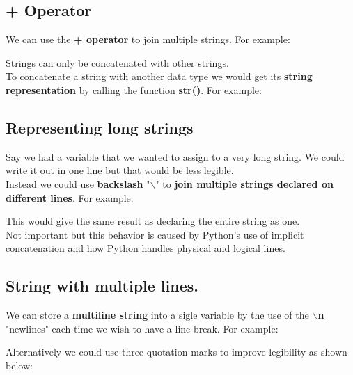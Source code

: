 \documentclass[13pt,a4paper,oneside]{book}
\begin{document}
\subsection{+ Operator}%
\label{sub:+ Operator}
We can use the \textbf{+ operator} to join multiple strings. For example:
	
	\begin{tcolorbox}[title=Output,center title,hbox]
	\end{tcolorbox}
Strings can only be concatenated with other strings.\\
To concatenate a string with another data type we would get its \textbf{string representation} by calling the function \textbf{str()}. For example:
	
	\begin{tcolorbox}[title=Output,center title,hbox]
	\end{tcolorbox}
\break
\subsection{Representing long strings}%
\label{sub:Representing long strings}
Say we had a variable that we wanted to assign to a very long string. We could write it out in one line but that would be less legible.\\
Instead we could use \textbf{backslash} "$\backslash$" to \textbf{join multiple strings declared on different lines}. For example:
	
This would give the same result as declaring the entire string as one.\\
Not important but this behavior is caused by Python's use of implicit concatenation and how Python handles physical and logical lines.
\subsection*{String with multiple lines.}%
\label{sub:String with multiple lines.}
We can store a \textbf{multiline string} into a sigle variable by the use of the $\backslash$\textbf{n} "newlines" each time we wish to have a line break. For example:
	
Alternatively we could use three quotation marks to improve legibility as shown below:
	
	\begin{tcolorbox}[title=Output,hbox]
	\end{tcolorbox}
\break
\end{document}
